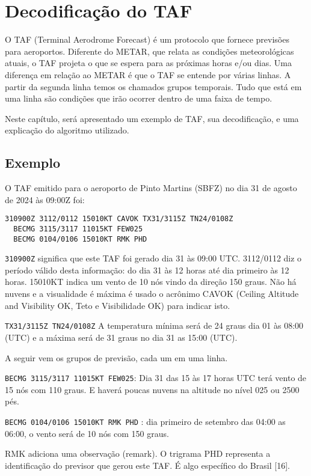 \chapter{Decodificação do TAF}

O TAF (Terminal Aerodrome Forecast) é um protocolo que fornece
previsões para aeroportos. Diferente
do METAR, que relata as condições meteorológicas atuais, o TAF projeta o que se
espera para as próximas horas e/ou dias. Uma diferença em relação ao METAR é que o 
TAF se entende por várias linhas.
A partir da segunda linha temos os chamados grupos temporais. Tudo que está em uma linha
são condições que irão ocorrer dentro de uma faixa de tempo. 

Neste capítulo, será apresentado um exemplo de TAF, sua decodificação,
e uma explicação do algoritmo utilizado.

\section{Exemplo}
O TAF emitido para o aeroporto de Pinto Martins (SBFZ) no dia 31 de agosto 
de 2024 às 09:00Z foi:

\begin{verbatim}
310900Z 3112/0112 15010KT CAVOK TX31/3115Z TN24/0108Z 
  BECMG 3115/3117 11015KT FEW025 
  BECMG 0104/0106 15010KT RMK PHD
\end{verbatim}

\texttt{310900Z} significa que este TAF foi gerado dia 31 às 09:00 UTC. 3112/0112 diz 
o período válido desta informação: do dia 31 às 
12 horas até dia primeiro às 12 horas. 15010KT indica um vento de 10 nós vindo 
da direção 150 graus. Não há nuvens e a visualidade é máxima é usado o acrônimo 
CAVOK (Ceiling Altitude and Visibility OK, Teto e Visibilidade OK) para indicar isto.

\texttt{TX31/3115Z TN24/0108Z} A temperatura mínima será de 24 graus dia 01 às 08:00 (UTC) e a máxima será 
de 31 graus no dia 31 as 15:00 (UTC).

A seguir vem os grupos de previsão, cada um em uma linha.

\texttt{BECMG 3115/3117 11015KT FEW025}: Dia 31 das 15 às 17 horas UTC terá vento de 
15 nós com 110 graus. E haverá poucas nuvens na altitude no nível 025 ou 2500 pés.

\texttt{BECMG 0104/0106 15010KT RMK PHD} : dia primeiro de setembro das 04:00 as 06:00, 
o vento será de 10 nós com 150 graus.

RMK adiciona uma observação (remark). O trigrama PHD representa a identificação 
do previsor que gerou este TAF. É algo específico do Brasil [16].

